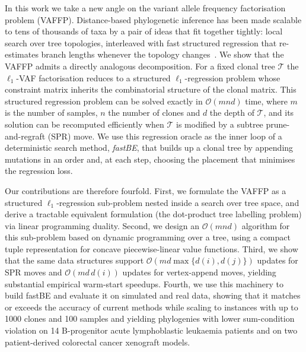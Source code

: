 \documentclass[11pt]{article}
\begin{document}
In this work we take a new angle on the variant allele frequency factorisation problem (VAFFP). Distance-based phylogenetic inference has been made scalable to tens of thousands of taxa by a pair of ideas that fit together tightly: local search over tree topologies, interleaved with fast structured regression that re-estimates branch lengths whenever the topology changes~\citep{desper2002fastme,lefort2015fastme,price2010fasttree}. We show that the VAFFP admits a directly analogous decomposition. For a fixed clonal tree $\mathcal{T}$ the $\ell_1$-VAF factorisation reduces to a structured $\ell_1$-regression problem whose constraint matrix inherits the combinatorial structure of the clonal matrix. This structured regression problem can be solved exactly in $\mathcal{O}(mnd)$ time, where $m$ is the number of samples, $n$ the number of clones and $d$ the depth of $\mathcal{T}$, and its solution can be recomputed efficiently when $\mathcal{T}$ is modified by a subtree prune-and-regraft (SPR) move. We use this regression oracle as the inner loop of a deterministic search method, \emph{fastBE}, that builds up a clonal tree by appending mutations in an order and, at each step, choosing the placement that minimises the regression loss.

Our contributions are therefore fourfold. First, we formulate the VAFFP as a structured $\ell_1$-regression sub-problem nested inside a search over tree space, and derive a tractable equivalent formulation (the dot-product tree labelling problem) via linear programming duality. Second, we design an $\mathcal{O}(mnd)$ algorithm for this sub-problem based on dynamic programming over a tree, using a compact tuple representation for concave piecewise-linear value functions. Third, we show that the same data structures support $\mathcal{O}(md\max\{d(i),d(j)\})$ updates for SPR moves and $\mathcal{O}(md\,d(i))$ updates for vertex-append moves, yielding substantial empirical warm-start speedups. Fourth, we use this machinery to build fastBE and evaluate it on simulated and real data, showing that it matches or exceeds the accuracy of current methods while scaling to instances with up to 1000 clones and 100 samples and yielding phylogenies with lower sum-condition violation on 14 B-progenitor acute lymphoblastic leukaemia patients and on two patient-derived colorectal cancer xenograft models.
\end{document}
